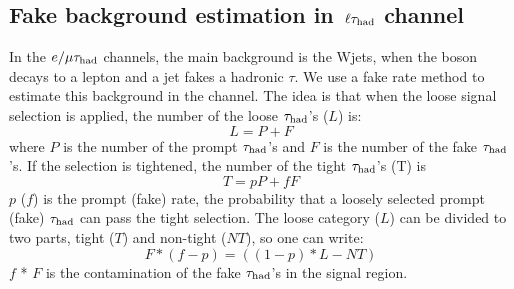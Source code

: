 \subsection{\texorpdfstring{Fake background estimation in $\,\ell\tau_{\rm had}$ channel}{Fake background estimation in lepton-tau channel}}
\label{sect:bkgFake}
In the $e/\mu\tau_{\rm had}$ channels, the main background is the Wjets, when the \Wpm boson decays to a lepton and a jet fakes a hadronic $\tau$.
We use a fake rate method to estimate this background \cite{CMS_AN_2010-261} in the \muTau channel.
The idea is that when the loose signal selection is applied, the number of the loose $\tau_{\rm had}$'s ($L$) is:
\begin{equation}
L = P + F
\end{equation}
where $P$ is the number of the  prompt $\tau_{\rm had}$'s and $F$ is the number of the  fake $\tau_{\rm had}$'s. If the selection is tightened, the number of the tight $\tau_{\rm had}$'s (T) is
\begin{equation}
 T = pP + fF
\end{equation} 
$p$ ($f$) is the prompt (fake) rate, the probability that a loosely selected prompt (fake) $\tau_{\rm had}$ can pass the  tight  selection. The loose category ($L$) can be divided to two parts, 
tight ($T$) and non-tight ($NT$), so one can write:
\begin{equation}
   F * (f - p) = ((1 - p) * L - NT)
\end{equation}
$f$ * $F$ is the contamination of the fake $\tau_{\rm had}$'s in the signal region. 

